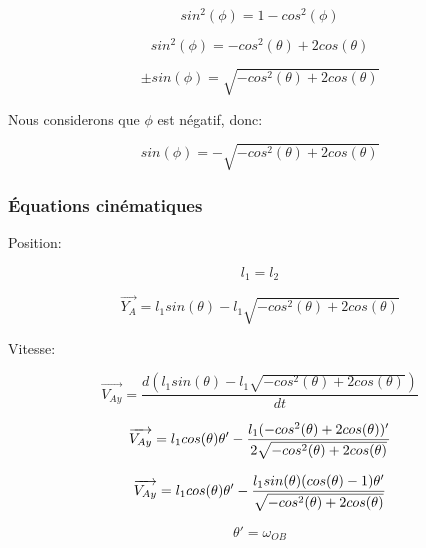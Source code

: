 \documentclass{article}
\begin{document}
\begin{equation}
sin^2(\phi) = 1-cos^2(\phi)
\end{equation}

\begin{equation}
sin^2(\phi) = -cos^2(\theta)+2cos(\theta)
\end{equation}

\begin{equation}
\pm sin(\phi) = \sqrt{-cos^2(\theta)+2cos(\theta)}
\end{equation}

\noindent Nous considerons que $\phi$ est négatif, donc:

\begin{equation}
sin(\phi) = -\sqrt{-cos^2(\theta)+2cos(\theta)}
\end{equation}

\subsubsection{Équations cinématiques}
\noindent Position:

\begin{equation}
l_1 = l_2
\end{equation}

\begin{equation}
\overrightarrow{Y_A} = l_1sin(\theta)-l_1\sqrt{-cos^2(\theta)+2cos(\theta)}
\end{equation}

\noindent Vitesse:

\begin{equation}
\overrightarrow{V_{Ay}} = \frac{d(l_1sin(\theta)-l_1\sqrt{-cos^2(\theta)+2cos(\theta)})}{dt}
\end{equation}

\begin{equation}
\overrightarrow{V_{Ay}} = l_1cos(\theta)\theta'-\\
\frac{l_1(-cos^2(\theta)+2cos(\theta))'}{2\sqrt{-cos^2(\theta)+2cos(\theta)}}
\end{equation}

\begin{equation}
\overrightarrow{V_{Ay}} = l_1cos(\theta)\theta'-\\
\frac{l_1sin(\theta)(cos(\theta)-1)\theta'}{\sqrt{-cos^2(\theta)+2cos(\theta)}}
\end{equation}

\begin{equation}
\theta' = \omega_{OB}
\end{equation}
\end{document}
